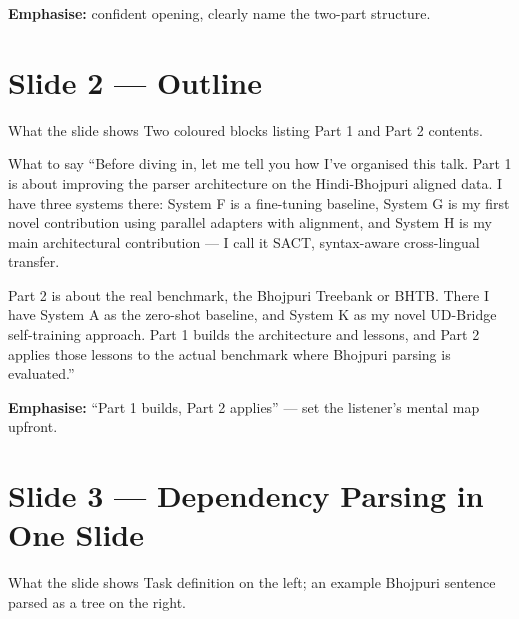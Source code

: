 \documentclass[11pt]{article}
\begin{document}
\begin{tipbox}
\textbf{Emphasise:} confident opening, clearly name the two-part structure.
\end{tipbox}

\section{Slide 2 --- Outline}

\begin{pitchbox}{What the slide shows}
Two coloured blocks listing Part 1 and Part 2 contents.
\end{pitchbox}

\begin{pitchbox}{What to say}
``Before diving in, let me tell you how I've organised this talk. Part 1 is about improving the parser architecture on the Hindi-Bhojpuri aligned data. I have three systems there: System F is a fine-tuning baseline, System G is my first novel contribution using parallel adapters with alignment, and System H is my main architectural contribution --- I call it SACT, syntax-aware cross-lingual transfer.

Part 2 is about the real benchmark, the Bhojpuri Treebank or BHTB. There I have System A as the zero-shot baseline, and System K as my novel UD-Bridge self-training approach. Part 1 builds the architecture and lessons, and Part 2 applies those lessons to the actual benchmark where Bhojpuri parsing is evaluated.''
\end{pitchbox}

\begin{tipbox}
\textbf{Emphasise:} ``Part 1 builds, Part 2 applies'' --- set the listener's mental map upfront.
\end{tipbox}

\section{Slide 3 --- Dependency Parsing in One Slide}

\begin{pitchbox}{What the slide shows}
Task definition on the left; an example Bhojpuri sentence parsed as a tree on the right.
\end{pitchbox}
\end{document}
